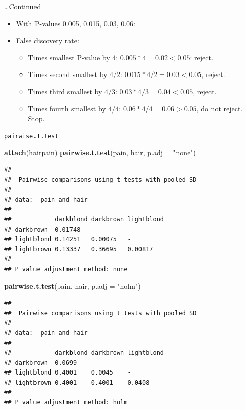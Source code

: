 \documentclass[ignorenonframetext,]{beamer}
\newenvironment{Shaded}{\begin{snugshade}}{\end{snugshade}}
\newcommand{\DataTypeTok}[1]{\textcolor[rgb]{0.13,0.29,0.53}{#1}}
\newcommand{\KeywordTok}[1]{\textcolor[rgb]{0.13,0.29,0.53}{\textbf{#1}}}
\newcommand{\NormalTok}[1]{#1}
\newcommand{\StringTok}[1]{\textcolor[rgb]{0.31,0.60,0.02}{#1}}
\begin{document}
\begin{frame}{\ldots Continued}
\protect\hypertarget{continued}{}

\begin{itemize}
\item
  With P-values 0.005, 0.015, 0.03, 0.06:
\item
  False discovery rate:

  \begin{itemize}
  \item
    Times smallest P-value by 4: \(0.005*4=0.02<0.05\): reject.
  \item
    Times second smallest by \(4/2\): \(0.015*4/2=0.03<0.05\), reject.
  \item
    Times third smallest by \(4/3\): \(0.03*4/3=0.04<0.05\), reject.
  \item
    Times fourth smallest by \(4/4\): \(0.06*4/4=0.06>0.05\), do not
    reject. Stop.
  \end{itemize}
\end{itemize}

\end{frame}

\begin{frame}[fragile]{\texttt{pairwise.t.test}}
\protect\hypertarget{pairwise.t.test}{}

\tiny

\begin{Shaded}
\begin{Highlighting}[]
\KeywordTok{attach}\NormalTok{(hairpain)}
\KeywordTok{pairwise.t.test}\NormalTok{(pain, hair, }\DataTypeTok{p.adj =} \StringTok{"none"}\NormalTok{)}
\end{Highlighting}
\end{Shaded}

\begin{verbatim}
## 
##  Pairwise comparisons using t tests with pooled SD 
## 
## data:  pain and hair 
## 
##            darkblond darkbrown lightblond
## darkbrown  0.01748   -         -         
## lightblond 0.14251   0.00075   -         
## lightbrown 0.13337   0.36695   0.00817   
## 
## P value adjustment method: none
\end{verbatim}

\begin{Shaded}
\begin{Highlighting}[]
\KeywordTok{pairwise.t.test}\NormalTok{(pain, hair, }\DataTypeTok{p.adj =} \StringTok{"holm"}\NormalTok{)}
\end{Highlighting}
\end{Shaded}

\begin{verbatim}
## 
##  Pairwise comparisons using t tests with pooled SD 
## 
## data:  pain and hair 
## 
##            darkblond darkbrown lightblond
## darkbrown  0.0699    -         -         
## lightblond 0.4001    0.0045    -         
## lightbrown 0.4001    0.4001    0.0408    
## 
## P value adjustment method: holm
\end{verbatim}

\normalsize

\end{frame}
\end{document}
